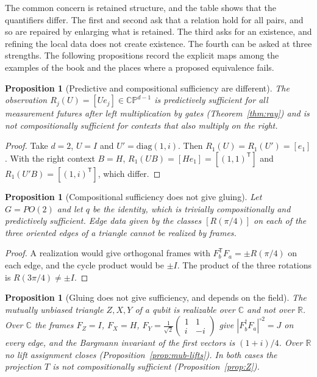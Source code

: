 \documentclass[11pt,oneside]{book}
\newtheorem{proposition}[theorem]{Proposition}
\theoremstyle{definition}
\theoremstyle{remark}
\begin{document}
The common concern is retained structure, and the table shows that the quantifiers differ. The first and second ask that a relation hold for all pairs, and so are repaired by enlarging what is retained. The third asks for an existence, and refining the local data does not create existence. The fourth can be asked at three strengths. The following propositions record the explicit maps among the examples of the book and the places where a proposed equivalence fails.

\begin{proposition}[Predictive and compositional sufficiency are different]\label{prop:pred-comp}
The observation $R_j(U)=[Ue_j]\in\mathbb{CP}^{d-1}$ is predictively sufficient for all measurement futures after left multiplication by gates (Theorem~\ref{thm:ray}) and is not compositionally sufficient for contexts that also multiply on the right.
\end{proposition}

\begin{proof}
Take $d=2$, $U=I$ and $U'=\mathrm{diag}(1,i)$. Then $R_1(U)=R_1(U')=[e_1]$. With the right context $B=H$, $R_1(UB)=[He_1]=[(1,1)^{\mathsf T}]$ and $R_1(U'B)=[(1,i)^{\mathsf T}]$, which differ.
\end{proof}

\begin{proposition}[Compositional sufficiency does not give gluing]\label{prop:comp-glue}
Let $G=PO(2)$ and let $q$ be the identity, which is trivially compositionally and predictively sufficient. Edge data given by the classes $[R(\pi/4)]$ on each of the three oriented edges of a triangle cannot be realized by frames.
\end{proposition}

\begin{proof}
A realization would give orthogonal frames with $F_b^{\mathsf T}F_a=\pm R(\pi/4)$ on each edge, and the cycle product would be $\pm I$. The product of the three rotations is $R(3\pi/4)\neq\pm I$.
\end{proof}

\begin{proposition}[Gluing does not give sufficiency, and depends on the field]\label{prop:glue-field}
The mutually unbiased triangle $Z,X,Y$ of a qubit is realizable over $\mathbb C$ and not over $\mathbb R$. Over $\mathbb C$ the frames $F_Z=I$, $F_X=H$, $F_Y=\tfrac1{\sqrt2}\begin{pmatrix}1&1\\i&-i\end{pmatrix}$ give $|F_b^\dagger F_a|^{\circ2}=J$ on every edge, and the Bargmann invariant of the first vectors is $(1+i)/4$. Over $\mathbb R$ no lift assignment closes (Proposition~\ref{prop:mub-lifts}). In both cases the projection $T$ is not compositionally sufficient (Proposition~\ref{prop:Z}).
\end{proposition}
\end{document}
